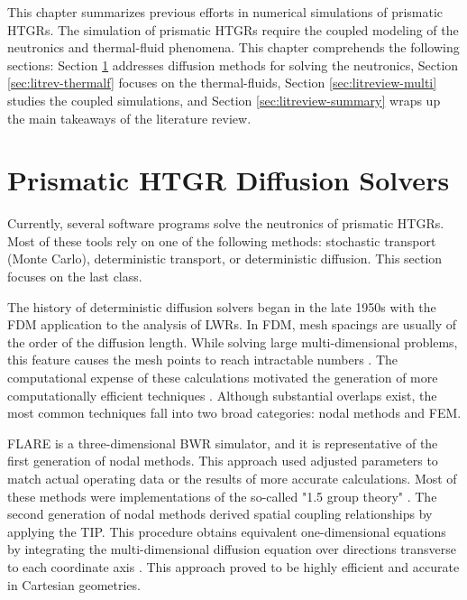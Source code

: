 This chapter summarizes previous efforts in numerical simulations of prismatic HTGRs.
The simulation of prismatic HTGRs require the coupled modeling of the neutronics and thermal-fluid phenomena.
This chapter comprehends the following sections: Section \ref{sec:litreview-neut} addresses diffusion methods for solving the neutronics, Section \ref{sec:litrev-thermalf} focuses on the thermal-fluids, Section \ref{sec:litreview-multi} studies the coupled simulations, and Section \ref{sec:litreview-summary} wraps up the main takeaways of the literature review.

\section{Prismatic HTGR Diffusion Solvers}
\label{sec:litreview-neut}

Currently, several software programs solve the neutronics of prismatic \glspl{HTGR}.
Most of these tools rely on one of the following methods: stochastic transport (Monte Carlo), deterministic transport, or deterministic diffusion.
This section focuses on the last class.

The history of deterministic diffusion solvers began in the late 1950s with the \gls{FDM} application to the analysis of \glspl{LWR}.
In \gls{FDM}, mesh spacings are usually of the order of the diffusion length.
While solving large multi-dimensional problems, this feature causes the mesh points to reach intractable numbers \cite{lewis_finite_1986}.
The computational expense of these calculations motivated the generation of more computationally efficient techniques \cite{lawrence_progress_1986}.
Although substantial overlaps exist, the most common techniques fall into two broad categories: nodal methods and \gls{FEM}.

FLARE \cite{delp_flare_1964} is a three-dimensional \gls{BWR} simulator, and it is representative of the first generation of nodal methods.
This approach used adjusted parameters to match actual operating data or the results of more accurate calculations.
Most of these methods were implementations of the so-called "1.5 group theory" \cite{gupta_nodal_1981}.
The second generation of nodal methods derived spatial coupling relationships by applying the \gls{TIP}.
This procedure obtains equivalent one-dimensional equations by integrating the multi-dimensional diffusion equation over directions transverse to each coordinate axis \cite{lawrence_progress_1986}.
This approach proved to be highly efficient and accurate in Cartesian geometries.

